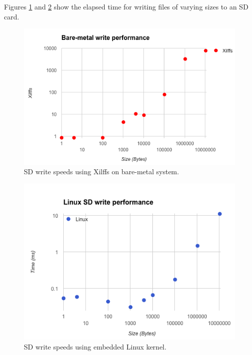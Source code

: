 Figures \ref{fig:standalone_write_graph} and \ref{fig:linux_write_graph} show the elapsed time for writing files of varying sizes to an SD card. 

\begin{figure}
  \centering
  \includegraphics[width=1\textwidth]{./img/standalone_write_graph.png}
  \caption{SD write speeds using Xilffs on bare-metal system.}
  \label{fig:standalone_write_graph}
\end{figure}

\begin{figure}
  \centering
  \includegraphics[width=1\textwidth]{./img/linux_write_graph.png}
  \caption{SD write speeds using embedded Linux kernel.}
  \label{fig:linux_write_graph}
\end{figure}


